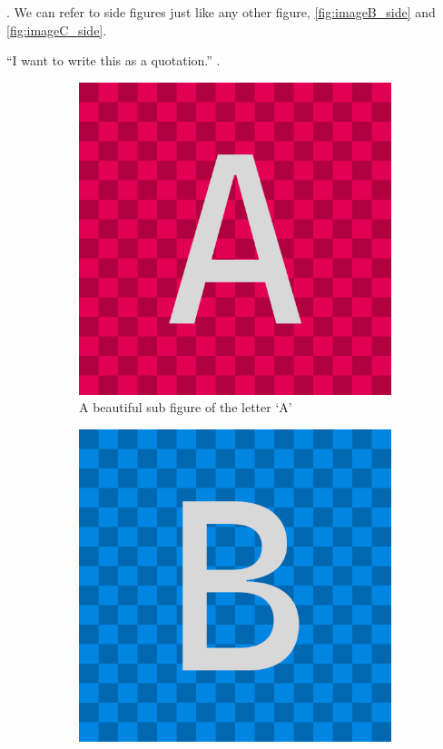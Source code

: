 \documentclass[a4paper, 12pt]{article}
\begin{document}
\lipsum[1-2]. We can refer to side figures just like any other figure, \autoref{fig:imageB_side} and \autoref{fig:imageC_side}.

``I want to write this as a quotation.''
\lipsum[2-5].

\begin{figure}[htbp]
    \centering

    \begin{subfigure}{0.48\textwidth}
        \centering
        \includegraphics[width=0.98\linewidth]{ ImageA }
        \caption{A beautiful sub figure of the letter `A'}
        \label{fig:imageA_sub}
    \end{subfigure}
    \hfill
    \begin{subfigure}{0.48\textwidth}
        \centering
        \includegraphics[width=0.98\linewidth]{ ImageB }

\end{subfigure}
\end{figure}
\end{document}
